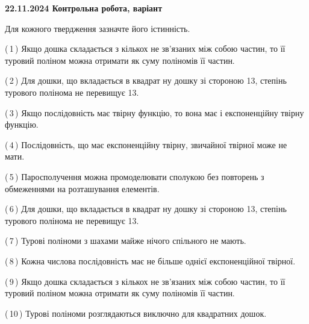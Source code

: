 \documentclass[12pt, ukrainian]{article}
\begin{document}
\begin {large}
\begin {large}
\begin {large}
\begin {large}
\begin {large}
\begin {large}
\begin {large}
\begin {large}
\begin {large}
\begin {large}
\begin {large}
\begin {large}
{\vspace{5mm}
}
\newpage

\begin {large}

\textbf{22.11.2024 Контрольна робота, варіант  }\par


{
Для кожного твердження зазначте його істинність.\par

\vspace{2mm}

(\,1\,) Якщо дошка складається з кількох не зв’язаних між собою частин, то її туровий поліном можна отримати як суму поліномів її частин.%



(\,2\,) Для дошки, що вкладається в квадрат ну дошку зі стороною 13, степінь турового полінома не перевищує 13.%



(\,3\,) Якщо послідовність має твірну функцію, то вона має і експоненційну твірну функцію.%



(\,4\,) Послідовність, що має експоненційну твірну, звичайної твірної може не мати.%



(\,5\,) Паросполучення можна промоделювати сполукою без повторень з обмеженнями на розташування елементів.%



(\,6\,) Для дошки, що вкладається в квадрат ну дошку зі стороною 13, степінь турового полінома не перевищує 13.%



(\,7\,) Турові поліноми з шахами майже нічого спільного не мають.%



(\,8\,) Кожна числова послідовність має не більше однієї  експоненційної твірної.%



(\,9\,) Якщо дошка складається з кількох не зв’язаних між собою частин, то її туровий поліном можна отримати як суму поліномів її частин.%



(\,10\,) Турові поліноми розглядаються виключно для квадратних дошок.%




\vspace{5mm}
}
\newpage

\begin {large}


\end{large}
\end{large}
\end{large}
\end{large}
\end{large}
\end{large}
\end{large}
\end{large}
\end{large}
\end{large}
\end{large}
\end{large}
\end{large}
\end{large}
\end{document}
